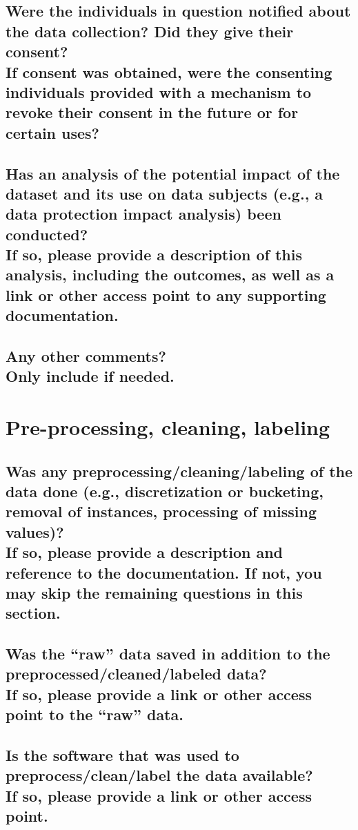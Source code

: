 \documentclass[letterpaper, 10 pt, conference]{ieeeconf}  %
\newcommand{\subtitle}[1]{{\\ \small \normalfont \color{purple} #1}}
\begin{document}
\subsection{Were the individuals in question notified about the data collection? Did they give their consent? \subtitle{If consent was obtained, were the consenting individuals provided with a mechanism to revoke their consent in the future or for certain uses?}}


\subsection{Has an analysis of the potential impact of the dataset and its use on data subjects (e.g., a data protection impact analysis) been conducted? \subtitle{If so, please provide a description of this analysis, including the outcomes, as well as a link or other access point to any supporting documentation.}}


\subsection{Any other comments?
\subtitle{Only include if needed.}}

\section{Pre-processing, cleaning, labeling}

\subsection{Was any preprocessing/cleaning/labeling of the data done (e.g., discretization or bucketing, removal of instances, processing of missing values)? \subtitle{If so, please provide a description and reference to the documentation. If not, you may skip the remaining questions in this section.}}

\subsection{Was the “raw” data saved in addition to the preprocessed/cleaned/labeled data? \subtitle{If so, please provide a link or other access point to the “raw” data. }}

\subsection{Is the software that was used to preprocess/clean/label the data available? \subtitle{If so, please provide a link or other access point.}}
\end{document}
